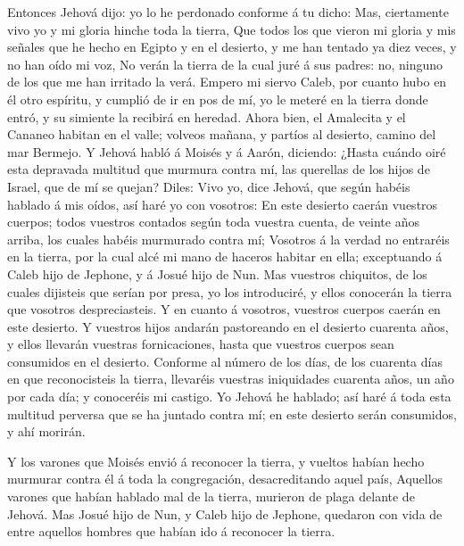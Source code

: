  Entonces Jehová dijo: yo lo he perdonado conforme á tu
dicho:  Mas, ciertamente vivo yo y mi gloria hinche toda la
tierra,  Que todos los que vieron mi gloria y mis señales
que he hecho en Egipto y en el desierto, y me han tentado ya diez veces,
y no han oído mi voz,  No verán la tierra de la cual juré á
sus padres: no, ninguno de los que me han irritado la verá.
 Empero mi siervo Caleb, por cuanto hubo en él otro
espíritu, y cumplió de ir en pos de mí, yo le meteré en la tierra donde
entró, y su simiente la recibirá en heredad.  Ahora bien,
el Amalecita y el Cananeo habitan en el valle; volveos mañana, y partíos
al desierto, camino del mar Bermejo.  Y Jehová habló á
Moisés y á Aarón, diciendo:  ¿Hasta cuándo oiré esta
depravada multitud que murmura contra mí, las querellas de los hijos de
Israel, que de mí se quejan?  Diles: Vivo yo, dice Jehová,
que según habéis hablado á mis oídos, así haré yo con vosotros:
 En este desierto caerán vuestros cuerpos; todos vuestros
contados según toda vuestra cuenta, de veinte años arriba, los cuales
habéis murmurado contra mí;  Vosotros á la verdad no
entraréis en la tierra, por la cual alcé mi mano de haceros habitar en
ella; exceptuando á Caleb hijo de Jephone, y á Josué hijo de Nun.
 Mas vuestros chiquitos, de los cuales dijisteis que serían
por presa, yo los introduciré, y ellos conocerán la tierra que vosotros
despreciasteis.  Y en cuanto á vosotros, vuestros cuerpos
caerán en este desierto.  Y vuestros hijos andarán
pastoreando en el desierto cuarenta años, y ellos llevarán vuestras
fornicaciones, hasta que vuestros cuerpos sean consumidos en el
desierto.  Conforme al número de los días, de los cuarenta
días en que reconocisteis la tierra, llevaréis vuestras iniquidades
cuarenta años, un año por cada día; y conoceréis mi castigo.
 Yo Jehová he hablado; así haré á toda esta multitud
perversa que se ha juntado contra mí; en este desierto serán consumidos,
y ahí morirán.

 Y los varones que Moisés envió á reconocer la tierra, y
vueltos habían hecho murmurar contra él á toda la congregación,
desacreditando aquel país,  Aquellos varones que habían
hablado mal de la tierra, murieron de plaga delante de Jehová.
 Mas Josué hijo de Nun, y Caleb hijo de Jephone, quedaron
con vida de entre aquellos hombres que habían ido á reconocer la tierra.

